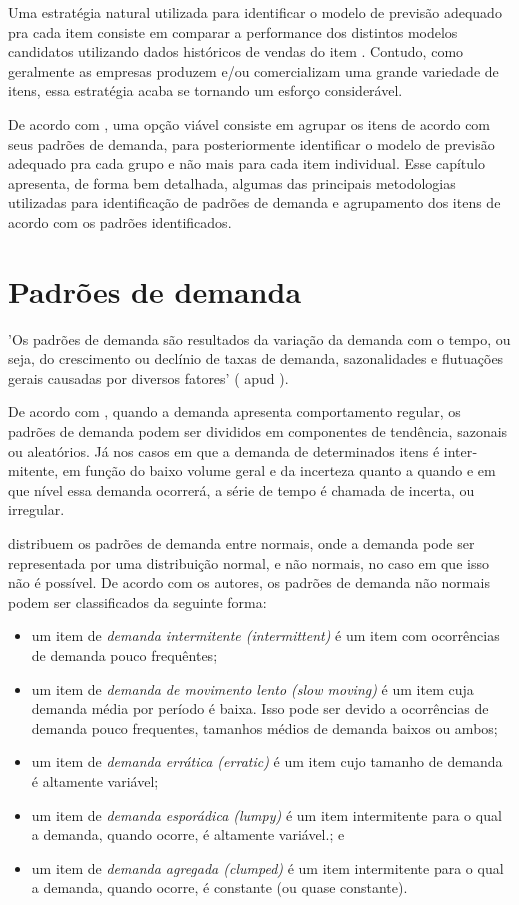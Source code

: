 \documentclass{book}
\begin{document}
Uma estratégia natural utilizada para identificar o modelo de previsão adequado pra cada item consiste em comparar a performance dos distintos modelos candidatos utilizando dados históricos de vendas do item \citep{UlrichEtAl2022}. Contudo, como geralmente as empresas produzem e/ou comercializam uma grande variedade de itens, essa estratégia acaba se tornando um esforço considerável. 

De acordo com \cite{UlrichEtAl2022}, uma opção viável consiste em agrupar os itens de acordo com seus padrões de demanda, para posteriormente identificar o modelo de previsão adequado pra cada grupo e não mais para cada item individual. Esse capítulo apresenta, de forma bem detalhada, algumas das principais metodologias utilizadas para identificação de padrões de demanda e agrupamento dos itens de acordo com os padrões identificados.

\section{Padrões de demanda}

'Os padrões de demanda são resultados da variação da demanda com o tempo, ou seja, do crescimento ou declínio de taxas de demanda, sazonalidades e flutuações gerais causadas por diversos fatores' (\cite{Ballou2001} apud \cite{WernerEtAl2006}). 

De acordo com \cite{Ballou2006}, quando a demanda apresenta comportamento regular, os padrões de demanda podem ser divididos em compo­nentes de tendência, sazonais ou aleatórios. Já nos casos em que a demanda de determinados itens é inter­mitente, em função do baixo volume geral e da incerte­za quanto a quando e em que nível essa demanda ocorrerá, a série de tempo é chamada de incerta, ou irregu­lar.

\cite{BoylanEtAl2008} distribuem os padrões de demanda entre normais, onde a demanda pode ser representada por uma distribuição normal, e não normais, no caso em que isso não é possível. De acordo com os autores, os padrões de demanda não normais podem ser classificados da seguinte forma:

\begin{itemize}
  \item um item de \emph{demanda intermitente (intermittent)} é um item com ocorrências de demanda pouco frequêntes;
  \item um item de \emph{demanda de movimento lento (slow moving)} é um item cuja demanda média por período é baixa. Isso pode ser devido a ocorrências de demanda pouco frequentes, tamanhos médios de demanda baixos ou ambos;
  \item um item de \emph{demanda errática (erratic)} é um item cujo tamanho de demanda é altamente variável;
  \item um item de \emph{demanda esporádica (lumpy)} é um item intermitente para o qual a demanda, quando ocorre, é altamente variável.; e
  \item um item de \emph{demanda agregada (clumped)} é um item intermitente para o qual a demanda, quando ocorre, é constante (ou quase constante).
\end{itemize}
\end{document}
